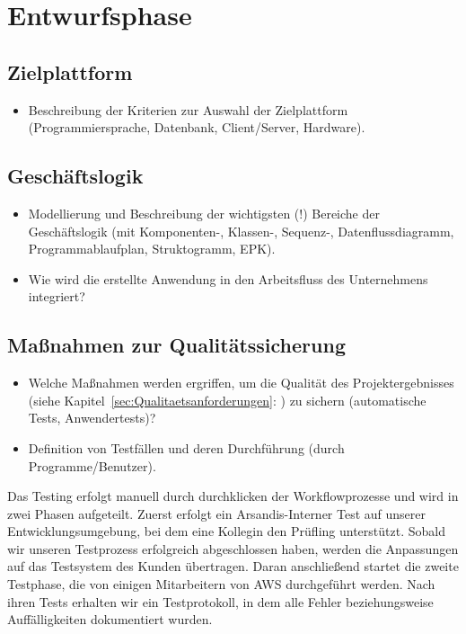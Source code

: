 \section{Entwurfsphase} 
\label{sec:Entwurfsphase}

\subsection{Zielplattform}
\label{sec:Zielplattform}

\begin{itemize}
	\item Beschreibung der Kriterien zur Auswahl der Zielplattform (\ua Programmiersprache, Datenbank, Client/Server, Hardware).
\end{itemize}

\subsection{Geschäftslogik}
\label{sec:Geschaeftslogik}

\begin{itemize}
	\item Modellierung und Beschreibung der wichtigsten (!) Bereiche der Geschäftslogik (\zB mit Kom\-po\-nen\-ten-, Klassen-, Sequenz-, Datenflussdiagramm, Programmablaufplan, Struktogramm, EPK).
	\item Wie wird die erstellte Anwendung in den Arbeitsfluss des Unternehmens integriert?
\end{itemize}


\subsection{Maßnahmen zur Qualitätssicherung}
\label{sec:Qualitaetssicherung}
\begin{itemize}
	\item Welche Maßnahmen werden ergriffen, um die Qualität des Projektergebnisses (siehe Kapitel~\ref{sec:Qualitaetsanforderungen}: ) zu sichern (\zB automatische Tests, Anwendertests)?
	\item \Ggfs Definition von Testfällen und deren Durchführung (durch Programme/Benutzer).
\end{itemize}

Das Testing erfolgt manuell durch \glqq durchklicken\grqq{} der Workflowprozesse und wird in zwei Phasen aufgeteilt.
Zuerst erfolgt ein Arsandis-Interner Test auf unserer Entwicklungsumgebung, bei dem eine Kollegin den Prüfling unterstützt.
Sobald wir unseren Testprozess erfolgreich abgeschlossen haben, werden die Anpassungen auf das Testsystem des Kunden übertragen.
Daran anschließend startet die zweite Testphase, die von einigen Mitarbeitern von \ac{AWS} durchgeführt werden.
Nach ihren Tests erhalten wir ein Testprotokoll, in dem alle Fehler beziehungsweise Auffälligkeiten dokumentiert wurden.

